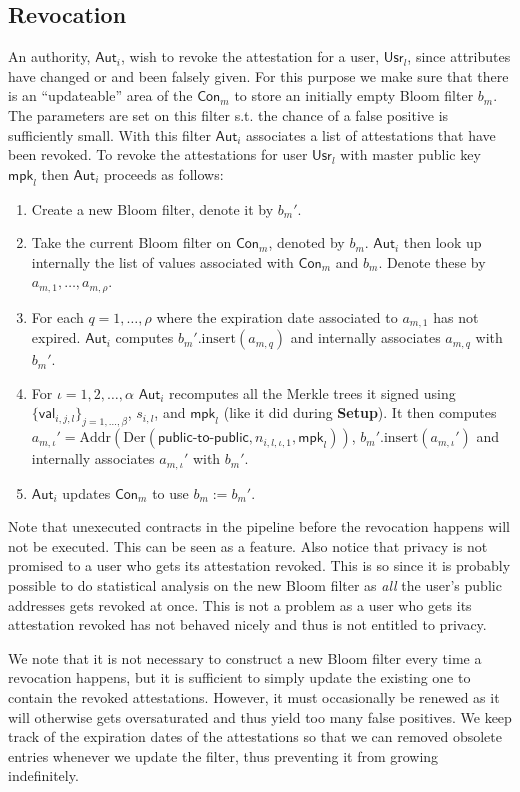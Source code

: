 \documentclass[11pt]{article} %
\newcommand{\aut}{\ensuremath{\mathsf{Aut}_i}}
\newcommand{\val}{\ensuremath{\mathsf{val}_{i,j,l}}}
\newcommand{\usr}{\ensuremath{\mathsf{Usr}_l}}
\newcommand{\con}{\ensuremath{\mathsf{Con}_m}}
\newcommand{\mpk}{\ensuremath{\mathsf{mpk}}}
\newcommand{\Der}{\ensuremath{\mathrm{Der}}}
\newcommand{\Addr}{\ensuremath{\mathrm{Addr}}}
\renewcommand{\insert}{\ensuremath{\mathrm{insert}}}
\begin{document}
\subsection{Revocation}
An authority, $\aut$, wish to revoke the attestation for a user, $\usr$, since attributes have changed or and been falsely given. For this purpose we make sure that there is an ``updateable'' area of the $\con$ to store an initially empty Bloom filter $b_m$. The parameters are set on this filter s.t. the chance of a false positive is sufficiently small. With this filter $\aut$ associates a list of attestations that have been revoked. To revoke the attestations for user $\usr$ with master public key $\mpk_l$ then $\aut$ proceeds as follows:
\begin{enumerate}
	\item Create a new Bloom filter, denote it by $b_m'$.
	\item Take the current Bloom filter on $\con$, denoted by $b_m$. $\aut$ then look up internally the list of values associated with $\con$ and $b_m$. Denote these by $a_{m, 1}, \dots, a_{m, \rho}$.
	\item For each $q=1, \dots, \rho$ where the expiration date associated to $a_{m,1}$ has not expired. $\aut$ computes $b_m'.\insert(a_{m, q})$ and internally associates $a_{m,q}$ with $b_m'$.
	\item \sloppy For $\iota=1, 2, \dots, \alpha$ $\aut$ recomputes all the Merkle trees it signed using $\{\val\}_{j=1, \dots, \beta}$, $s_{i, l}$, and $\mpk_l$ (like it did during \textbf{Setup}). It then computes $a_{m, \iota}' = \Addr\left(\Der\left(\mathsf{public}\mbox{-}\mathsf{to}\mbox{-}\mathsf{public}, n_{i,l,\iota, 1}, \mpk_l\right)\right)$, $b_m'.\insert(a_{m, \iota}')$ and internally associates $a_{m,\iota}'$ with $b_m'$.
	\item $\aut$ updates $\con$ to use $b_m:=b_m'$.
\end{enumerate}
Note that unexecuted contracts in the pipeline before the revocation happens will not be executed. This can be seen as a feature. Also notice that privacy is not promised to a user who gets its attestation revoked. This is so since it is probably possible to do statistical analysis on the new Bloom filter as \emph{all} the user's public addresses gets revoked at once. This is not a problem as a user who gets its attestation revoked has not behaved nicely and thus is not entitled to privacy.

We note that it is not necessary to construct a new Bloom filter every time a revocation happens, but it is sufficient to simply update the existing one to contain the revoked attestations. However, it must occasionally be renewed as it will otherwise gets oversaturated and thus yield too many false positives. We keep track of the expiration dates of the attestations so that we can removed obsolete entries whenever we update the filter, thus preventing it from growing indefinitely.
\end{document}
